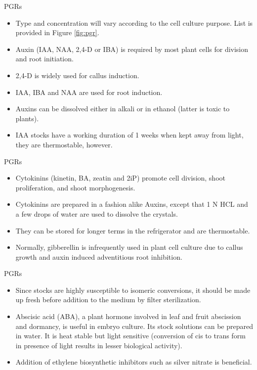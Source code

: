 \documentclass[ignorenonframetext,aspectratio=169]{beamer}
\providecommand{\tightlist}{%
  \setlength{\itemsep}{0pt}\setlength{\parskip}{0pt}}
\begin{document}
\begin{frame}{PGRs}
\protect\hypertarget{pgrs}{}

\begin{itemize}
\tightlist
\item
  Type and concentration will vary according to the cell culture
  purpose. List is provided in Figure \ref{fig:pgr}.
\item
  Auxin (IAA, NAA, 2,4-D or IBA) is required by most plant cells for
  division and root initiation.
\item
  2,4-D is widely used for callus induction.
\item
  IAA, IBA and NAA are used for root induction.
\item
  Auxins can be dissolved either in alkali or in ethanol (latter is
  toxic to plants).
\item
  IAA stocks have a working duration of 1 weeks when kept away from
  light, they are thermostable, however.
\end{itemize}

\end{frame}

\begin{frame}{PGRs}
\protect\hypertarget{pgrs-1}{}

\begin{itemize}
\tightlist
\item
  Cytokinins (kinetin, BA, zeatin and 2iP) promote cell division, shoot
  proliferation, and shoot morphogenesis.
\item
  Cytokinins are prepared in a fashion alike Auxins, except that 1 N HCL
  and a few drops of water are used to dissolve the crystals.
\item
  They can be stored for longer terms in the refrigerator and are
  thermostable.
\item
  Normally, gibberellin is infrequently used in plant cell culture due
  to callus growth and auxin induced adventitious root inhibition.
\end{itemize}

\end{frame}

\begin{frame}{PGRs}
\protect\hypertarget{pgrs-2}{}

\begin{itemize}
\tightlist
\item
  Since stocks are highly susceptible to isomeric conversions, it should
  be made up fresh before addition to the medium by filter
  sterilization.
\item
  Abscisic acid (ABA), a plant hormone involved in leaf and fruit
  abscission and dormancy, is useful in embryo culture. Its stock
  solutions can be prepared in water. It is heat stable but light
  sensitive (conversion of cis to trans form in presence of light
  results in lesser biological activity).
\item
  Addition of ethylene biosynthetic inhibitors such as silver nitrate is
  beneficial.
\end{itemize}

\end{frame}
\end{document}
